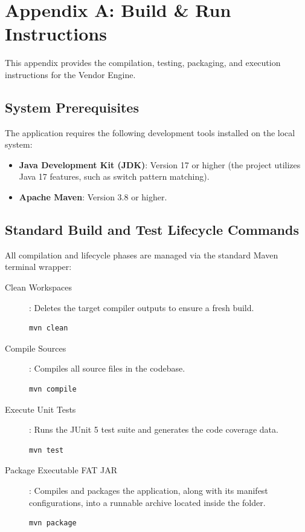 
\section{Appendix A: Build \& Run Instructions}
\label{sec:appendix_build_run}

This appendix provides the compilation, testing, packaging, and execution instructions for the Vendor Engine.

\subsection{System Prerequisites}
The application requires the following development tools installed on the local system:
\begin{itemize}
    \item \textbf{Java Development Kit (JDK)}: Version 17 or higher (the project utilizes Java 17 features, such as switch pattern matching).
    \item \textbf{Apache Maven}: Version 3.8 or higher.
\end{itemize}

\subsection{Standard Build and Test Lifecycle Commands}
All compilation and lifecycle phases are managed via the standard Maven terminal wrapper:
\begin{description}
    \item[Clean Workspaces]: Deletes the target compiler outputs to ensure a fresh build.
    \begin{lstlisting}[language=bash]
mvn clean
    \end{lstlisting}
    \item[Compile Sources]: Compiles all source files in the codebase.
    \begin{lstlisting}[language=bash]
mvn compile
    \end{lstlisting}
    \item[Execute Unit Tests]: Runs the JUnit 5 test suite and generates the code coverage data.
    \begin{lstlisting}[language=bash]
mvn test
    \end{lstlisting}
    \item[Package Executable FAT JAR]: Compiles and packages the application, along with its manifest configurations, into a runnable archive located inside the  folder.
    \begin{lstlisting}[language=bash]
mvn package
    \end{lstlisting}
\end{description}


